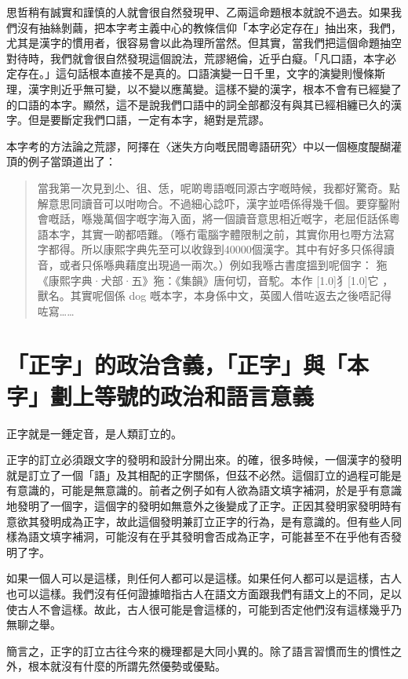 \documentclass[a5paper, 10pt, openany]{book} %
\begin{document}
思哲稍有誠實和謹慎的人就會很自然發現甲、乙兩這命題根本就說不過去。如果我們沒有抽絲剝繭，把本字考主義中心的教條信仰「本字必定存在」抽出來，我們，尤其是漢字的慣用者，很容易會以此為理所當然。但其實，當我們把這個命題抽空對待時，我們就會很自然發現這個說法，荒謬絕倫，近乎白癡。「凡口語，本字必定存在。」這句話根本直接不是真的。口語演變一日千里，文字的演變則慢條斯理，漢字則近乎無可變，以不變以應萬變。這樣不變的漢字，根本不會有已經變了的口語的本字。顯然，這不是說我們口語中的詞全部都沒有與其已經相纏已久的漢字。但是要斷定我們口語，一定有本字，絕對是荒謬。

本字考的方法論之荒謬，阿擇在〈迷失方向嘅民間粵語研究〉中以一個極度醍醐灌頂的例子當頭道出了： 

\begin{quotation}
  當我第一次見到尐、徂、恁，呢啲粵語嘅同源古字嘅時候，我都好驚奇。點解意思同讀音可以咁吻合。不過細心諗吓，漢字並唔係得幾千個。要穿鑿附會嘅話，喺幾萬個字嘅字海入面，將一個讀音意思相近嘅字，老屈佢話係粵語本字，其實一啲都唔難。（喺冇電腦字體限制之前，其實你用乜嘢方法寫字都得。所以康熙字典先至可以收錄到40000個漢字。其中有好多只係得讀音，或者只係喺典藉度出現過一兩次。）例如我喺古書度搵到呢個字： 狏《康熙字典·犬部·五》狏：《集韻》唐何切，音駝。本作 \scalebox{0.5}[1.0]{犭}\scalebox{0.5}[1.0]{它} ，獸名。其實呢個係 dog 嘅本字，本身係中文，英國人借咗返去之後唔記得咗寫…… 
  
\end{quotation}

\section{「正字」的政治含義，「正字」與「本字」劃上等號的政治和語言意義}

正字就是一錘定音，是人類訂立的。 

正字的訂立必須跟文字的發明和設計分開出來。的確，很多時候，一個漢字的發明就是訂立了一個「語」及其相配的正字關係，但茲不必然。這個訂立的過程可能是有意識的，可能是無意識的。前者之例子如有人欲為語文填字補洞，於是乎有意識地發明了一個字，這個字的發明如無意外之後變成了正字。正因其發明家發明時有意欲其發明成為正字，故此這個發明兼訂立正字的行為，是有意識的。但有些人同樣為語文填字補洞，可能沒有在乎其發明會否成為正字，可能甚至不在乎他有否發明了字。

如果一個人可以是這樣，則任何人都可以是這樣。如果任何人都可以是這樣，古人也可以這樣。我們沒有任何證據暗指古人在語文方面跟我們有語文上的不同，足以使古人不會這樣。故此，古人很可能是會這樣的，可能到否定他們沒有這樣幾乎乃無聊之舉。

簡言之，正字的訂立古往今來的機理都是大同小異的。除了語言習慣而生的慣性之外，根本就沒有什麼的所謂先然優勢或優點。
\end{document}
